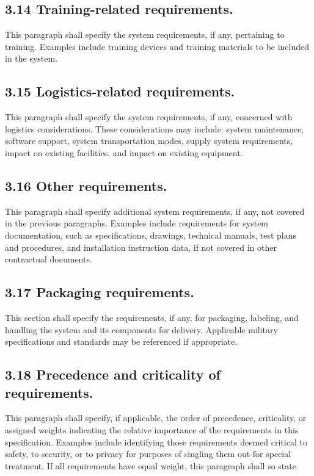 \subsection{3.14 Training-related requirements.}

This paragraph shall specify the system requirements, if any, pertaining
to training. Examples include training devices and training materials to
be included in the system.

\subsection{3.15 Logistics-related requirements.}

This paragraph shall specify the system requirements, if any, concerned
with logistics considerations. These considerations may include: system
maintenance, software support, system transportation modes, supply
system requirements, impact on existing facilities, and impact on
existing equipment.

\subsection{3.16 Other requirements.}

This paragraph shall specify additional system requirements, if any, not
covered in the previous paragraphs. Examples include requirements for
system documentation, such as specifications, drawings, technical
manuals, test plans and procedures, and installation instruction data,
if not covered in other contractual documents.

\subsection{3.17 Packaging requirements.}

This section shall specify the requirements, if any, for packaging,
labeling, and handling the system and its components for delivery.
Applicable military specifications and standards may be referenced if
appropriate.

\subsection{3.18 Precedence and criticality of requirements.}

This paragraph shall specify, if applicable, the order of precedence,
criticality, or assigned weights indicating the relative importance of
the requirements in this specification. Examples include identifying
those requirements deemed critical to safety, to security, or to privacy
for purposes of singling them out for special treatment. If all
requirements have equal weight, this paragraph shall so state.

